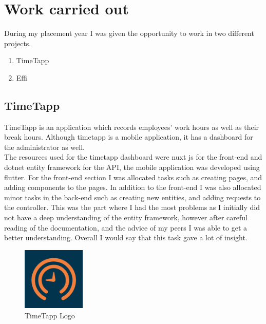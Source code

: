 \documentclass[12pt]{article}
\begin{document}
\section{Work carried out}
During my placement year I was given the opportunity to work in two different projects.
\begin{enumerate}
    \item TimeTapp
    \item Effi
\end{enumerate}
\subsection{TimeTapp}
TimeTapp is an application which records employees' work hours as well as their break hours. Although timetapp is
a mobile application, it has a dashboard for the administrator as well.\\
\newline
The resources used for the timetapp dashboard were nuxt js for the front-end and dotnet entity framework for the API, the
mobile application was developed using flutter.
For the front-end section I was allocated tasks such as creating pages, and adding components to the pages. 
In addition to the front-end I was also allocated minor tasks in the back-end such as creating new entities, and 
adding requests to the controller. This was the part where I had the most problems as I initially did not have 
a deep understanding of the entity framework, however after careful reading of the documentation, and the advice of 
my peers I was able to get a better understanding. Overall I would say that this task gave a lot of insight.\\



 \begin{figure}[ht]
  \includegraphics[width=3cm]{timetapp.png}
  \caption{TimeTapp Logo}
  \label{fig:timetapp}
\end{figure}
\end{document}
